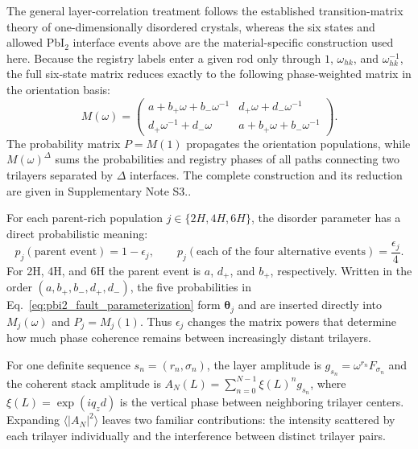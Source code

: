 The general layer-correlation treatment follows the established
transition-matrix theory of one-dimensionally disordered crystals, whereas the
six states and allowed PbI$_2$ interface events above are the material-specific
construction used here.\cite{HendricksTeller1942,KakinokiKomura1954,KakinokiKomura1965,Hart2018}
Because the registry labels enter a given rod only through
$1$, $\omega_{hk}$, and $\omega_{hk}^{-1}$, the full six-state matrix reduces
exactly to the following phase-weighted matrix in the orientation basis:
\begin{equation}
  M(\omega)=
  \begin{pmatrix}
    a+b_+\omega+b_-\omega^{-1} & d_+\omega+d_-\omega^{-1}\\
    d_+\omega^{-1}+d_-\omega & a+b_+\omega+b_-\omega^{-1}
  \end{pmatrix}.
  \label{eq:pbi2_reduced_transition}
\end{equation}
The probability matrix $P=M(1)$ propagates the orientation populations, while
$M(\omega)^\Delta$ sums the probabilities and registry phases of all paths
connecting two trilayers separated by $\Delta$ interfaces.  The complete construction and its  reduction are given in Supplementary
Note S3..

For each parent-rich population $j\in\{2H,4H,6H\}$, the disorder parameter has
a direct probabilistic meaning:
\begin{equation}
  p_j(\text{parent event})=1-\epsilon_j,
  \qquad
  p_j(\text{each of the four alternative events})=\frac{\epsilon_j}{4}.
  \label{eq:pbi2_fault_parameterization}
\end{equation}
For 2H, 4H, and 6H the parent event is $a$, $d_+$, and $b_+$,
respectively.  Written in the order
$(a,b_+,b_-,d_+,d_-)$, the five probabilities in
Eq.~\eqref{eq:pbi2_fault_parameterization} form
$\boldsymbol{\theta}_j$ and are inserted directly into $M_j(\omega)$ and
$P_j=M_j(1)$.  Thus $\epsilon_j$ changes the matrix powers that determine how much phase coherence remains
between increasingly distant trilayers.

For one definite sequence $s_n=(r_n,\sigma_n)$, the layer amplitude is
$g_{s_n}=\omega^{r_n}F_{\sigma_n}$ and the coherent stack amplitude is
$A_N(L)=\sum_{n=0}^{N-1}\xi(L)^n g_{s_n}$, where
$\xi(L)=\exp(iq_zd)$ is the vertical phase between neighboring trilayer
centers.  Expanding $\langle|A_N|^2\rangle$ leaves two familiar
contributions: the intensity scattered by each trilayer individually and the
interference between distinct trilayer pairs.

